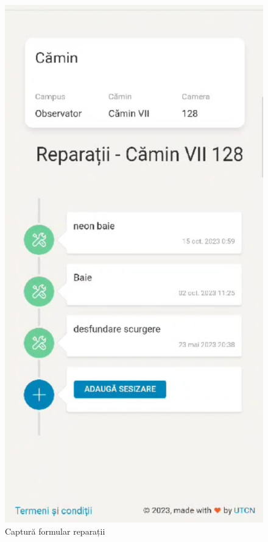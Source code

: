 \documentclass[12pt,a4paper]{report}
\theoremstyle{definition}
\theoremstyle{remark}
\begin{document}
\begin{figure}[H]
\begin{minipage}{.5\textwidth}
    \end{minipage}%
    \begin{minipage}{.5\textwidth}
        \centering
        \includegraphics[width=.8\linewidth]{resurse/aplicatii_similare/utcn2.png}
        \caption{Captură formular reparații}

    \end{minipage}
\end{figure}
\end{document}
